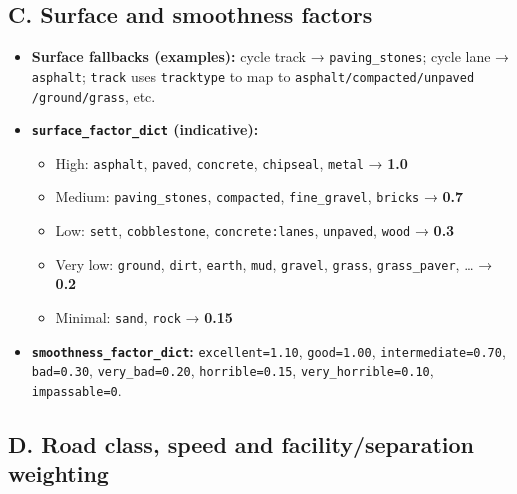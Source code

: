 \documentclass[
  12pt,
  oneside]{book}
\providecommand{\tightlist}{%
  \setlength{\itemsep}{0pt}\setlength{\parskip}{0pt}}
\begin{document}
\subsection*{C. Surface and smoothness factors}\label{c.-surface-and-smoothness-factors}

\begin{itemize}
\tightlist
\item
  \textbf{Surface fallbacks (examples):} cycle track → \texttt{paving\_stones}; cycle lane → \texttt{asphalt}; \texttt{track} uses \texttt{tracktype} to map to \texttt{asphalt/compacted/unpaved}
  \texttt{/ground/grass}, etc.
\item
  \textbf{\texttt{surface\_factor\_dict} (indicative):}

  \begin{itemize}
  \tightlist
  \item
    High: \texttt{asphalt}, \texttt{paved}, \texttt{concrete}, \texttt{chipseal}, \texttt{metal} → \textbf{1.0}
  \item
    Medium: \texttt{paving\_stones}, \texttt{compacted}, \texttt{fine\_gravel}, \texttt{bricks} → \textbf{0.7}
  \item
    Low: \texttt{sett}, \texttt{cobblestone}, \texttt{concrete:lanes}, \texttt{unpaved}, \texttt{wood} → \textbf{0.3}
  \item
    Very low: \texttt{ground}, \texttt{dirt}, \texttt{earth}, \texttt{mud}, \texttt{gravel}, \texttt{grass}, \texttt{grass\_paver}, \ldots{} → \textbf{0.2}
  \item
    Minimal: \texttt{sand}, \texttt{rock} → \textbf{0.15}
  \end{itemize}
\item
  \textbf{\texttt{smoothness\_factor\_dict}:} \texttt{excellent=1.10}, \texttt{good=1.00}, \texttt{intermediate=0.70}, \texttt{bad=0.30}, \texttt{very\_bad=0.20}, \texttt{horrible=0.15}, \texttt{very\_horrible=0.10}, \texttt{impassable=0}.
\end{itemize}

\subsection*{D. Road class, speed and facility/separation weighting}\label{d.-road-class-speed-and-facilityseparation-weighting}
\end{document}
